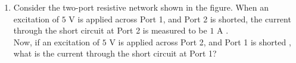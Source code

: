 \documentclass[a4paper, 11pt]{article}
\begin{document}
\begin{enumerate}
\begin{enumerate}
    \end{enumerate}

    \hfill{}

    \item Consider the two-port resistive network shown in the figure. When an excitation of $5$ V is applied across Port 1, and Port 2 is shorted, the current through the short circuit at Port 2 is measured to be $1$ A .\\Now, if an excitation of $5$ V is applied across Port 2, and Port 1 is shorted , what is the current through the short circuit at Port 1?
    

\end{enumerate}
\end{document}
